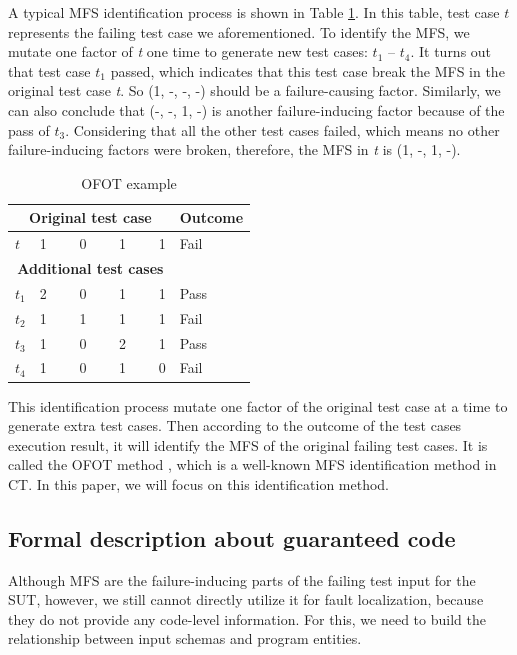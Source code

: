 \documentclass{sig-alternate-05-2015}
\begin{document}
A typical MFS identification process is shown in Table \ref{ofot-identify}. In this table, test case $t$ represents the failing test case we aforementioned. To identify the MFS, we mutate one factor of \emph{t} one time to generate new test cases: $t_{1}$ -- $t_{4}$.  It turns out that test case $t_{1}$ passed, which indicates that this test case break the MFS in the original test case \emph{t}. So (1, -, -, -) should be a failure-causing factor. Similarly, we can also conclude that (-, -, 1, -) is another failure-inducing factor because of the pass of $t_{3}$. Considering that all the other test cases failed, which means no other failure-inducing factors were broken, therefore, the MFS in \emph{t} is (1, -, 1, -).

\begin{table}[ht]
\caption{OFOT example}
\label{ofot-identify}
\center
\begin{tabular}{llllll}
 \hline
\multicolumn{5}{c}{\bfseries Original test case} & \bfseries Outcome \\  \hline
 $t$ & \multicolumn{4}{l}{1 \ \ \ \ 0 \ \ \ \  1 \ \ \ \ 1 } & Fail \\
 \hline
\multicolumn{5}{c}{\bfseries Additional  test cases} &  \\  \hline
$t_{1}$ &\multicolumn{4}{l}{2  \ \ \ \  0 \ \ \ \  1 \ \ \ \ 1 }& Pass \\
$t_{2}$ &\multicolumn{4}{l}{1  \ \ \ \  1 \ \ \ \  1 \ \ \ \ 1 } & Fail \\
$t_{3}$ &\multicolumn{4}{l}{1  \ \ \ \  0 \ \ \ \  2 \ \ \ \ 1 } & Pass \\
$t_{4}$ &\multicolumn{4}{l}{1  \ \ \ \  0 \ \ \ \  1 \ \ \ \ 0 } & Fail \\
 \hline
\end{tabular}
\end{table}

This identification process mutate one factor of the original test case at a time to generate extra test cases. Then according to the outcome of the test cases execution result, it will identify the MFS of the original failing test cases. It is called the OFOT method \cite{nie2011minimal}, which is a well-known MFS identification method in CT. In this paper, we will focus on this identification method.


\subsection{Formal description about guaranteed code}\label{sec:pre:guar}
Although MFS are the failure-inducing parts of the failing test input for the SUT, however, we still cannot directly utilize it for fault localization, because they do not provide any code-level information. For this, we need to build the relationship between input schemas and program entities.
\end{document}
